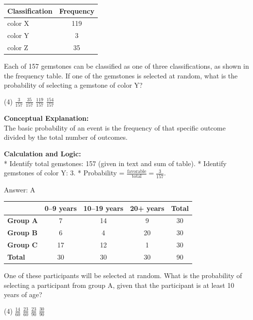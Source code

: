 \documentclass[11pt,paper=a4,answers]{exam}
\begin{document}
\begin{questions}
\question
\begin{center}
\begin{tabular}{|l|c|}
\hline
\textbf{Classification} & \textbf{Frequency} \\ \hline
color X & 119 \\ \hline
color Y & 3 \\ \hline
color Z & 35 \\ \hline
\end{tabular}
\end{center}
Each of 157 gemstones can be classified as one of three classifications, as shown in the frequency table. If one of the gemstones is selected at random, what is the probability of selecting a gemstone of color Y?
\begin{tasks}(4)
    \task $\frac{3}{157}$
    \task $\frac{35}{157}$
    \task $\frac{119}{157}$
    \task $\frac{154}{157}$
\end{tasks}

\begin{solution}
\textbf{Conceptual Explanation:} \\
The basic probability of an event is the frequency of that specific outcome divided by the total number of outcomes.

\vspace{30pt}

\textbf{Calculation and Logic:} \\
* Identify total gemstones: 157 (given in text and sum of table).
* Identify gemstones of color Y: 3.
* Probability = $\frac{\text{favorable}}{\text{total}} = \frac{3}{157}$.

\vspace{30pt}

Answer: \colorbox{yellow!100}{A}
\end{solution}

\vspace{60pt}

\question
\begin{center}
\begin{tabular}{|l|c|c|c|c|}
\hline
 & \textbf{0--9 years} & \textbf{10--19 years} & \textbf{20+ years} & \textbf{Total} \\ \hline
\textbf{Group A} & 7 & 14 & 9 & 30 \\ \hline
\textbf{Group B} & 6 & 4 & 20 & 30 \\ \hline
\textbf{Group C} & 17 & 12 & 1 & 30 \\ \hline
\textbf{Total} & 30 & 30 & 30 & 90 \\ \hline
\end{tabular}
\end{center}
One of these participants will be selected at random. What is the probability of selecting a participant from group A, given that the participant is at least 10 years of age?
\begin{tasks}(4)
    \task $\frac{14}{60}$
    \task $\frac{23}{60}$
    \task $\frac{23}{90}$
    \task $\frac{30}{90}$
\end{tasks}


\end{questions}
\end{document}
